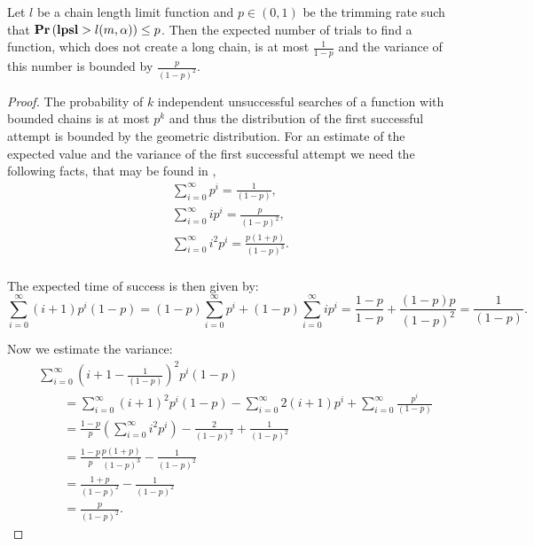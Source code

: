 \begin{lemma}
\label{lemma-linear-transformations-trials}
Let $l$ be a chain length limit function and $p \in (0, 1)$ be the trimming rate such that $\mathbf{Pr}\left(\mathbf{lpsl} > l(m, \alpha)\right) \leq p $. Then the expected number of trials to find a function, which does not create a long chain, is at most $\frac{1}{1 - p}$ and the variance of this number is bounded by $\frac p{(1-p) ^ 2}$.
\end{lemma}
\begin{proof}
The probability of $k$ independent unsuccessful searches of a function with bounded chains is at most $p ^ k$ and thus the distribution of the first successful attempt is bounded by the geometric distribution. For an estimate of the expected value and the variance of the first successful attempt we need the following facts, that may be found in \cite{210884},
\begin{gather*}
	\displaystyle\sum_{i = 0}^{\infty} p ^ i = \frac{1}{(1 - p)} \text{,} \\
	\displaystyle\sum_{i = 0}^{\infty} i p ^ i = \frac{p}{(1 - p) ^ 2} \text{,} \\
	\displaystyle\sum_{i = 0}^{\infty} i^2 p ^ i = \frac{p(1 + p)}{(1 - p) ^ 3} \text{.} \\
\end{gather*}

The expected time of success is then given by:
\[
\sum_{i = 0}^{\infty} (i + 1)p^i(1 - p)= (1 - p)\sum_{i = 0}^{\infty}p^i + (1 - p)\sum_{i = 0}^{\infty}ip^i = \frac{1 - p}{1 - p} + \frac{(1 - p)p}{(1- p)^2} = \frac{1}{(1 - p)} \text{.}
\]

Now we estimate the variance:
\[
\begin{split}
& \sum_{i = 0}^{\infty} \left(i + 1 - \frac{1}{(1 - p)}\right) ^ 2  p ^ i (1 - p) \\
	& \qquad = \sum_{i = 0}^{\infty} \left(i + 1\right) ^ 2 p ^ i (1 - p) - \sum_{i = 0}^{\infty} 2(i + 1)p ^ i + \sum_{i = 0}^{\infty} \frac{p ^ i}{(1 - p)} \\
	& \qquad = \frac{1 - p}{p}\left(\sum_{i = 0}^{\infty} i ^ 2 p ^ i \right) - \frac{2}{(1 - p) ^ 2} + \frac{1}{(1 - p) ^ 2} \\
	& \qquad = \frac{1 - p}{p}\frac{p(1 + p)}{(1 - p) ^ 3} - \frac{1}{(1 - p) ^ 2} \\
	& \qquad = \frac{1 + p }{(1 - p) ^ 2} - \frac{1}{(1 - p) ^ 2} \\
	& \qquad = \frac{p}{(1 - p) ^ 2} \text{.}
\end{split}
\]
\end{proof}

